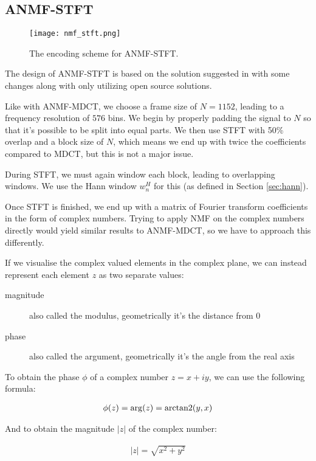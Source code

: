 \subsection{ANMF-STFT}
\begin{figure}[ht]
	\caption[ANMF-STFT Encoder]{The encoding scheme for ANMF-STFT.}		\label{fig:encoding_nmf_stft}
	\centering
	\texttt{[image: nmf\_stft.png]}
\end{figure}

The design of ANMF-STFT is based on the solution suggested in \cite{nikunen_2010} with some changes along with only utilizing open source solutions.

Like with ANMF-MDCT, we choose a frame size of $N = 1152$, leading to a frequency resolution of $576$ bins. We begin by properly padding the signal to $N$ so that it's possible to be split into equal parts. We then use STFT with 50\% overlap and a block size of $N$, which means we end up with twice the coefficients compared to MDCT, but this is not a major issue.

During STFT, we must again window each block, leading to overlapping windows. We use the Hann window $w_n^H$ for this (as defined in Section \ref{sec:hann}).

Once STFT is finished, we end up with a matrix of Fourier transform coefficients in the form of complex numbers. Trying to apply NMF on the complex numbers directly would yield similar results to ANMF-MDCT, so we have to approach this differently.

If we visualise the complex valued elements in the complex plane, we can instead represent each element $z$ as two separate values:

\begin{description}
	\item[magnitude] also called the modulus, geometrically it's the distance from 0
	\item[phase] also called the argument, geometrically it's the angle from the real axis
\end{description}

To obtain the phase $\phi$ of a complex number $z = x + iy$, we can use the following formula:

\begin{align}
\phi(z) = \arg(z) = \operatorname{arctan2}(y,x)
\end{align}

And to obtain the magnitude $|z|$ of the complex number:

\begin{align}
|z| = \sqrt{x^2 + y^2}
\end{align}

